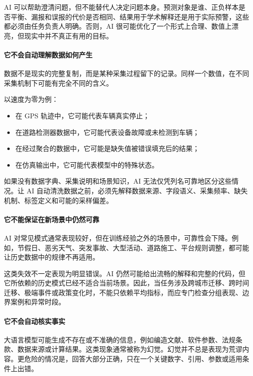 AI 可以帮助澄清问题，但不能替代人决定问题本身。预测对象是谁、正负样本是否平衡、漏报和误报的代价是否相同、结果用于学术解释还是用于实际预警，这些都必须由任务负责人明确。否则，AI 很可能优化了一个形式上合理、数值上漂亮，但现实中并不真正有用的目标。

\paragraph{它不会自动理解数据如何产生}

数据不是现实的完整复制，而是某种采集过程留下的记录。同样一个数值，在不同采集机制下可能有完全不同的含义。

以速度为零为例：

\begin{itemize}
\item 在 GPS 轨迹中，它可能代表车辆真实停止；
\item 在道路检测器数据中，它可能代表设备故障或未检测到车辆；
\item 在经过聚合的数据中，它可能是缺失值被错误填充后的结果；
\item 在仿真输出中，它可能代表模型中的特殊状态。
\end{itemize}

如果没有数据字典、采集说明和场景知识，AI 无法仅凭列名可靠地区分这些情况。让 AI 自动清洗数据之前，必须先解释数据来源、字段语义、采集频率、缺失机制、标签定义和可能的采样偏差。

\paragraph{它不能保证在新场景中仍然可靠}

AI 对常见模式通常表现较好，但在训练经验之外的场景中，可靠性会下降。例如，节假日、恶劣天气、突发事故、大型活动、道路施工、平台规则调整，都可能让历史数据中的规律不再适用。

这类失效不一定表现为明显错误。AI 仍然可能给出流畅的解释和完整的代码，但它所依赖的历史模式已经不适合当前场景。因此，当任务涉及跨城市迁移、跨时间迁移、极端事件或政策变化时，不能只依赖平均指标，而应专门检查分组表现、边界案例和异常时段。

\paragraph{它不会自动核实事实}

大语言模型可能生成不存在或不准确的信息，例如编造文献、软件参数、法规条款、数据来源或计算结果。这类现象通常被称为幻觉。幻觉并不总是表现为荒谬内容。更危险的情况是，回答大部分正确，只在一个关键数字、引用、参数或适用条件上出错。

